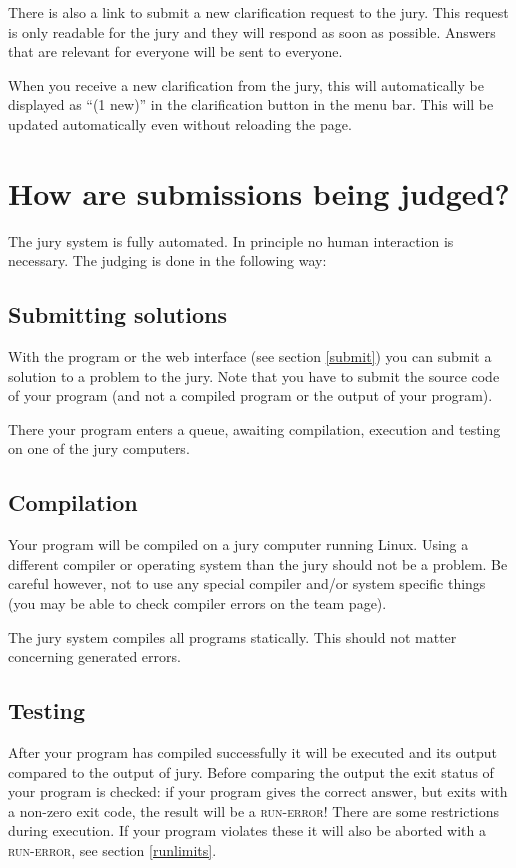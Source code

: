 There is also a link to submit a new clarification request to the
jury. This request is only readable for the jury and they will respond
as soon as possible. Answers that are relevant for everyone will be
sent to everyone.

When you receive a new clarification from the jury, this will
automatically be displayed as ``(1 new)'' in the clarification button
in the menu bar. This will be updated automatically even without reloading
the page.

\section{How are submissions being judged?}

The \DOMjudge jury system is fully automated. In principle no human
interaction is necessary. The judging is done in the following way:

\subsection{Submitting solutions}

With the  program or the web interface (see section
\ref{submit}) you can submit a solution to a problem to the jury.
Note that you have to submit the source code of your program
(and not a compiled program or the output of your program).

There your program enters a queue, awaiting compilation, execution
and testing on one of the jury computers.

\subsection{Compilation}

Your program will be compiled on a jury computer running Linux.
Using a different compiler or operating system than the jury should
not be a problem. Be careful however, not to use any special compiler
and/or system specific things (you may be able to check compiler errors
on the team page).

The jury system compiles all programs statically. This should not
matter concerning generated errors.

\subsection{Testing}

After your program has compiled successfully it will be executed and
its output compared to the output of jury. Before comparing the
output the exit status of your program is checked: if your program
gives the correct answer, but exits with a non-zero exit code, the
result will be a \textsc{run-error}! There are some restrictions during
execution. If your program violates these it will also be aborted
with a \textsc{run-error}, see section \ref{runlimits}.


